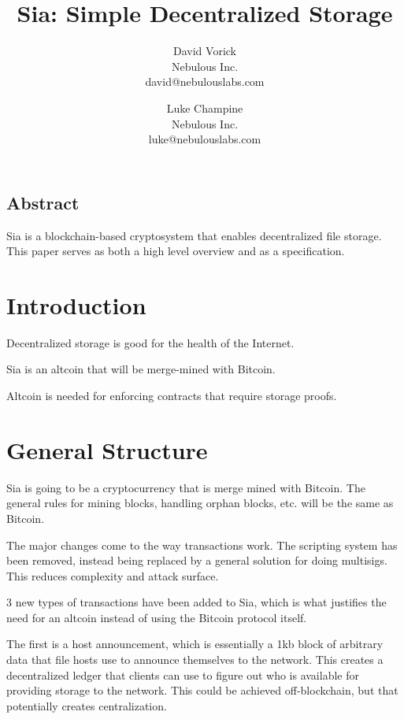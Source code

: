 \documentclass[twocolumn]{article}
\begin{document}
\frenchspacing

\title{Sia: Simple Decentralized Storage}

\author{
{\rm David Vorick}\\
Nebulous Inc.\\
david@nebulouslabs.com
\and
{\rm Luke Champine}\\
Nebulous Inc.\\
luke@nebulouslabs.com
}

\maketitle

\subsection*{Abstract}
Sia is a blockchain-based cryptosystem that enables decentralized file storage.
This paper serves as both a high level overview and as a specification.

\section{Introduction}
Decentralized storage is good for the health of the Internet.

Sia is an altcoin that will be merge-mined with Bitcoin.

Altcoin is needed for enforcing contracts that require storage proofs.

\section{General Structure}
Sia is going to be a cryptocurrency that is merge mined with Bitcoin.
The general rules for mining blocks, handling orphan blocks, etc. will be the same as Bitcoin.

The major changes come to the way transactions work.
The scripting system has been removed, instead being replaced by a general solution for doing multisigs.
This reduces complexity and attack surface.

3 new types of transactions have been added to Sia, which is what justifies the need for an altcoin instead of using the Bitcoin protocol itself.

The first is a host announcement, which is essentially a 1kb block of arbitrary data that file hosts use to announce themselves to the network.
This creates a decentralized ledger that clients can use to figure out who is available for providing storage to the network.
This could be achieved off-blockchain, but that potentially creates centralization.
\end{document}
